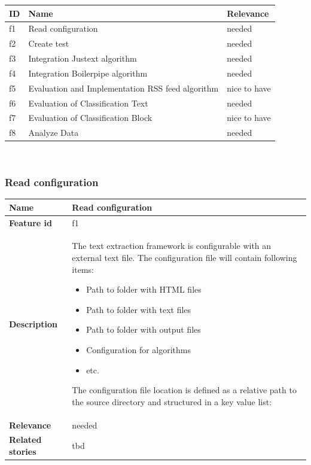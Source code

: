 	\begin{tabular}{ | p{1cm} | p{9cm} |p{3cm} |}
	\hline
	\textbf{ID}	& \textbf{Name}   					& \textbf{Relevance}	\\ \hline
	f1  		& Read configuration  								& needed 				\\ \hline
	f2  		& Create test										& needed 				\\ \hline
	f3  		& Integration Justext algorithm  					& needed 				\\ \hline
	f4  		& Integration Boilerpipe algorithm  				& needed 				\\ \hline
	f5  		& Evaluation and Implementation RSS feed algorithm 	& nice to have			\\ \hline
	f6  		& Evaluation of Classification Text					& needed 				\\ \hline
	f7  		& Evaluation of Classification Block	  			& nice to have			\\ \hline
	f8  		& Analyze Data 										& needed 				\\ \hline
	\end{tabular} \\



\subsubsection{Read configuration}

	\begin{tabular}{ | p{3cm} | p{12cm} |}
	\hline
	\textbf{Name} 				& Read configuration 				\\ \hline
	\textbf{Feature id} 		& f1 				\\ \hline
	\textbf{Description} 		& The text extraction framework is configurable with an external text file. The configuration file will contain following items:
							        \begin{itemize}
							        \item Path to folder with HTML files
							        \item Path to folder with text files
							        \item Path to folder with output files
							        \item Configuration for algorithms
							        \item etc.
						        \end{itemize} 
						        The configuration file location is defined as a relative path to the source directory and structured in a key value list: 

						         \\ \hline
	\textbf{Relevance} 			& needed 			\\ \hline
	\textbf{Related stories} 	& tbd		\\ \hline
	\end{tabular} \\

